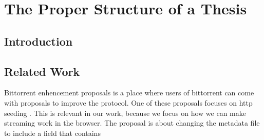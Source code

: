 \documentclass[ twoside,openright,titlepage,numbers=noenddot,headinclude,%
                footinclude=true,cleardoublepage=empty,abstractoff, %
                BCOR=5mm,paper=a4,fontsize=11pt,%
                ngerman,american,%
                ]{scrreprt}
\begin{document}
\frenchspacing
\raggedbottom
{} %
\pagestyle{plain}



\cleardoublepage
\cleardoublepage
\cleardoublepage
\pagestyle{scrheadings}
\cleardoublepage
\cleardoublepage{}
\cleardoublepage

\part{The Proper Structure of a Thesis}
\label{part:prop-struct-thes}
\cleardoublepage

\chapter{Introduction}\label{ch:introduction}


\chapter{Related Work}
\label{cha:related-work}
Bittorrent enhencement proposals is a place where users of bittorrent can come with proposals to improve the protocol.
One of these proposals focuses on http seeding \citep{httpSeed}.
This is relevant in our work, because we focus on how we can make streaming work in the browser. The proposal is about changing the metadata file to include a field that contains
\end{document}
